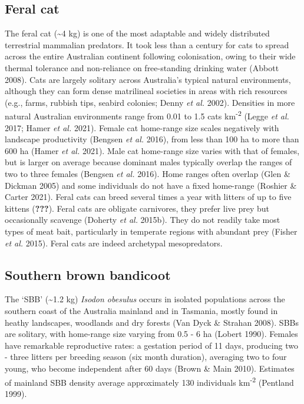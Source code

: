 \documentclass[11pt,a4paper,titlepage,twoside,openright]{style/unimelbthesis}
\begin{document}
\begin{mainmatter}
\hypertarget{feral-cat}{%
\subsection{Feral cat}\label{feral-cat}}

The feral cat (\textasciitilde4 kg) is one of the most adaptable and widely distributed terrestrial mammalian predators. It took less than a century for cats to spread across the entire Australian continent following colonisation, owing to their wide thermal tolerance and non-reliance on free-standing drinking water (Abbott 2008). Cats are largely solitary across Australia's typical natural environments, although they can form dense matrilineal societies in areas with rich resources (e.g., farms, rubbish tips, seabird colonies; Denny \emph{et al.} 2002). Densities in more natural Australian environments range from 0.01 to 1.5 cats km\textsuperscript{-2} (Legge \emph{et al.} 2017; Hamer \emph{et al.} 2021). Female cat home-range size scales negatively with landscape productivity (Bengsen \emph{et al.} 2016), from less than 100 ha to more than 600 ha (Hamer \emph{et al.} 2021). Male cat home-range size varies with that of females, but is larger on average because dominant males typically overlap the ranges of two to three females (Bengsen \emph{et al.} 2016). Home ranges often overlap (Glen \& Dickman 2005) and some individuals do not have a fixed home-range (Roshier \& Carter 2021). Feral cats can breed several times a year with litters of up to five kittens ({\textbf{???}}). Feral cats are obligate carnivores, they prefer live prey but occasionally scavenge (Doherty \emph{et al.} 2015b). They do not readily take most types of meat bait, particularly in temperate regions with abundant prey (Fisher \emph{et al.} 2015).
Feral cats are indeed archetypal mesopredators.

\hypertarget{southern-brown-bandicoot}{%
\subsection{Southern brown bandicoot}\label{southern-brown-bandicoot}}

The `SBB' (\textasciitilde1.2 kg) \emph{Isodon obesulus} occurs in isolated populations across the southern coast of the Australia mainland and in Tasmania, mostly found in heathy landscapes, woodlands and dry forests (Van Dyck \& Strahan 2008). SBBs are solitary, with home-range size varying from 0.5 - 6 ha (Lobert 1990). Females have remarkable reproductive rates: a gestation period of 11 days, producing two - three litters per breeding season (six month duration), averaging two to four young, who become independent after 60 days (Brown \& Main 2010). Estimates of mainland SBB density average approximately 130 individuals km\textsuperscript{-2} (Pentland 1999).


\end{mainmatter}
\end{document}
